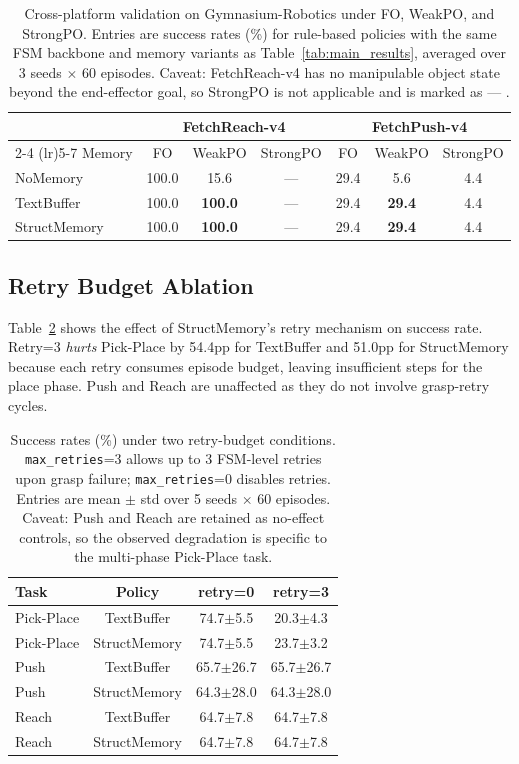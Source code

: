 \begin{table}[t]
\centering
\caption{Cross-platform validation on Gymnasium-Robotics under FO, WeakPO, and StrongPO. Entries are success rates (\%) for rule-based policies with the same FSM backbone and memory variants as Table~\ref{tab:main_results}, averaged over 3 seeds $\times$ 60 episodes. Caveat: FetchReach-v4 has no manipulable object state beyond the end-effector goal, so StrongPO is not applicable and is marked as --- .}
\label{tab:cross_platform}
\begin{tabular}{l ccc ccc}
\toprule
& \multicolumn{3}{c}{FetchReach-v4} & \multicolumn{3}{c}{FetchPush-v4} \\
\cmidrule(lr){2-4} \cmidrule(lr){5-7}
Memory & FO & WeakPO & StrongPO & FO & WeakPO & StrongPO \\
\midrule
NoMemory     & 100.0 & 15.6  & ---   & 29.4  & 5.6   & 4.4 \\
TextBuffer   & 100.0 & \textbf{100.0} & --- & 29.4  & \textbf{29.4} & 4.4 \\
StructMemory & 100.0 & \textbf{100.0} & --- & 29.4  & \textbf{29.4} & 4.4 \\
\bottomrule
\end{tabular}
\end{table}

\subsection{Retry Budget Ablation}

Table~\ref{tab:retry} shows the effect of StructMemory's retry mechanism on success rate. Retry=3 \emph{hurts} Pick-Place by 54.4pp for TextBuffer and 51.0pp for StructMemory because each retry consumes episode budget, leaving insufficient steps for the place phase. Push and Reach are unaffected as they do not involve grasp-retry cycles.

\begin{table}[t]
\centering
\caption{Success rates (\%) under two retry-budget conditions. \texttt{max\_retries}=3 allows up to 3 FSM-level retries upon grasp failure; \texttt{max\_retries}=0 disables retries. Entries are mean $\pm$ std over 5 seeds $\times$ 60 episodes. Caveat: Push and Reach are retained as no-effect controls, so the observed degradation is specific to the multi-phase Pick-Place task.}
\label{tab:retry}
\begin{tabular}{l ccc}
\toprule
Task & Policy & retry=0 & retry=3 \\
\midrule
Pick-Place & TextBuffer & 74.7$\pm$5.5 & 20.3$\pm$4.3 \\
Pick-Place & StructMemory & 74.7$\pm$5.5 & 23.7$\pm$3.2 \\
\midrule
Push & TextBuffer & 65.7$\pm$26.7 & 65.7$\pm$26.7 \\
Push & StructMemory & 64.3$\pm$28.0 & 64.3$\pm$28.0 \\
\midrule
Reach & TextBuffer & 64.7$\pm$7.8 & 64.7$\pm$7.8 \\
Reach & StructMemory & 64.7$\pm$7.8 & 64.7$\pm$7.8 \\
\bottomrule
\end{tabular}
\end{table}

